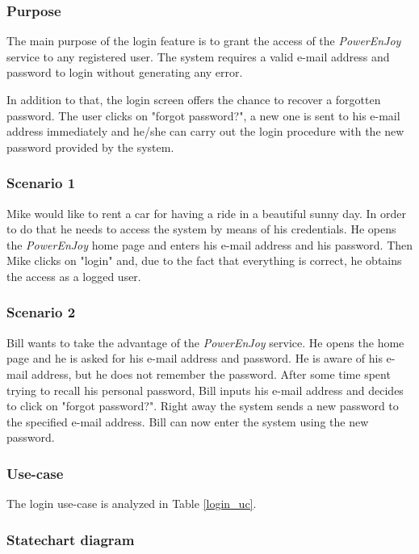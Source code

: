\subsubsection{Purpose}
The main purpose of the login feature is to grant the access of the \emph{PowerEnJoy} service to any registered user. The system requires a valid e-mail address and password to login without generating any error.

In addition to that, the login screen offers the chance to recover a forgotten password. The user clicks on "forgot password?", a new one is sent to his e-mail address immediately and he/she can carry out the login procedure with the new password provided by the system.

\subsubsection{Scenario 1}
Mike would like to rent a car for having a ride in a beautiful sunny day. In order to do that he needs to access the system by means of his credentials. He opens the \emph{PowerEnJoy} home page and enters his e-mail address and his password. Then Mike clicks on "login" and, due to the fact that everything is correct, he obtains the access as a logged user.

\subsubsection{Scenario 2}
Bill wants to take the advantage of the \emph{PowerEnJoy} service. He opens the home page and he is asked for his e-mail address and password. He is aware of his e-mail address, but he does not remember the password. After some time spent trying to recall his personal password, Bill inputs his e-mail address and decides to click on "forgot password?". Right away the system sends a new password to the specified e-mail address. Bill can now enter the system using the new password.

\subsubsection{Use-case}

The login use-case is analyzed in Table \ref{login_uc}.

\subsubsection{Statechart diagram}

